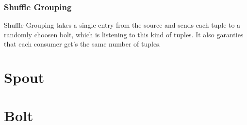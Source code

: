 \subsubsection{Shuffle Grouping}
Shuffle Grouping takes a single entry from the source and sends each tuple to a randomly choosen bolt,
which is listening to this kind of tuples. It also garanties that each consumer get's the same number of tuples.

\newpage

\section{Spout}


\newpage

\section{Bolt}


